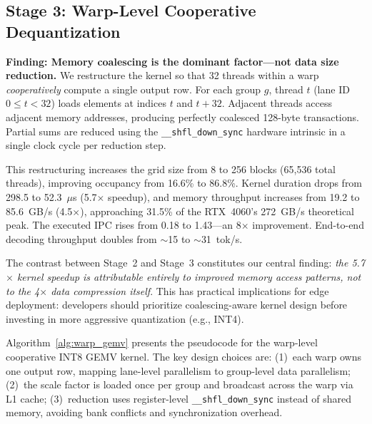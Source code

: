 \documentclass[conference]{IEEEtran}
\begin{document}
\subsection{Stage 3: Warp-Level Cooperative Dequantization}

\textbf{Finding: Memory coalescing is the dominant factor---not data size reduction.} We restructure the kernel so that 32 threads within a warp \emph{cooperatively} compute a single output row. For each group $g$, thread $t$ (lane ID $0 \leq t < 32$) loads elements at indices $t$ and $t+32$. Adjacent threads access adjacent memory addresses, producing perfectly coalesced 128-byte transactions. Partial sums are reduced using the \texttt{\_\_shfl\_down\_sync} hardware intrinsic in a single clock cycle per reduction step.

This restructuring increases the grid size from 8 to 256 blocks (65,536 total threads), improving occupancy from 16.6\% to 86.8\%. Kernel duration drops from 298.5 to 52.3~$\mu$s (5.7$\times$ speedup), and memory throughput increases from 19.2 to 85.6~GB/s (4.5$\times$), approaching 31.5\% of the RTX~4060's 272~GB/s theoretical peak. The executed IPC rises from 0.18 to 1.43---an 8$\times$ improvement. End-to-end decoding throughput doubles from $\sim$15 to $\sim$31~tok/s.

The contrast between Stage~2 and Stage~3 constitutes our central finding: \emph{the 5.7$\times$ kernel speedup is attributable entirely to improved memory access patterns, not to the 4$\times$ data compression itself}. This has practical implications for edge deployment: developers should prioritize coalescing-aware kernel design before investing in more aggressive quantization (e.g., INT4).

Algorithm~\ref{alg:warp_gemv} presents the pseudocode for the warp-level cooperative INT8 GEMV kernel. The key design choices are: (1)~each warp owns one output row, mapping lane-level parallelism to group-level data parallelism; (2)~the scale factor is loaded once per group and broadcast across the warp via L1 cache; (3)~reduction uses register-level \texttt{\_\_shfl\_down\_sync} instead of shared memory, avoiding bank conflicts and synchronization overhead.
\end{document}
